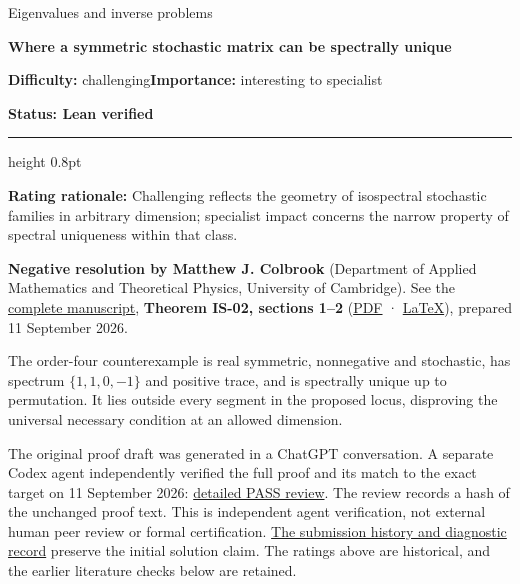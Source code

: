 \documentclass[11pt,a4paper]{article}
\makeatletter
\renewcommand{\subsection}{\Needspace{4\baselineskip}\@startsection{subsection}{2}{0pt}{9pt plus 1pt minus 1pt}{3pt}{\sffamily\bfseries\normalsize\color{ink}}}
\makeatother
\begin{document}
{\sffamily\small\color{muted}Eigenvalues and inverse problems\par}
\vspace{3pt}
{\raggedright{}\sffamily\bfseries\fontsize{21}{24}\selectfont\color{ink}Where
a symmetric stochastic matrix can be spectrally unique\par}
\vspace{7pt}
{\sffamily\small\textbf{Difficulty:} challenging\quad\textbf{Importance:} interesting
to specialist\par}
{\sffamily\small\bfseries\color{accent}Status: Lean verified\par}
\vspace{4pt}
{\color{accent}\hrule height 0.8pt}
\vspace{6pt}
\textbf{Rating rationale:} Challenging reflects the geometry of
isospectral stochastic families in arbitrary dimension; specialist
impact concerns the narrow property of spectral uniqueness within that
class.

\subsection{Resolution --- 2026-09-11}\label{resolution-2026-09-11}

\textbf{Negative resolution by Matthew J. Colbrook} (Department of
Applied Mathematics and Theoretical Physics, University of Cambridge).
See the
\href{https://github.com/ajt60gaibb/OpenProblemsInNLA/blob/main/eigenvalues-and-inverse-problems/IS-02/solution.md}{complete
manuscript}, \textbf{Theorem IS-02, sections 1--2}
(\href{https://github.com/ajt60gaibb/OpenProblemsInNLA/blob/main/eigenvalues-and-inverse-problems/IS-02/solution.pdf}{PDF}
·
\href{https://github.com/ajt60gaibb/OpenProblemsInNLA/blob/main/eigenvalues-and-inverse-problems/IS-02/solution.tex}{LaTeX}),
prepared 11 September 2026.

The order-four counterexample is real symmetric, nonnegative and
stochastic, has spectrum \(\{1,1,0,-1\}\) and positive trace, and is
spectrally unique up to permutation. It lies outside every segment in
the proposed locus, disproving the universal necessary condition at an
allowed dimension.

The original proof draft was generated in a ChatGPT conversation. A
separate Codex agent independently verified the full proof and its match
to the exact target on 11 September 2026:
\href{https://github.com/ajt60gaibb/OpenProblemsInNLA/blob/main/references/colbrook-2026-09-11/verification/reviews/IS-02-review.md}{detailed
PASS review}. The review records a hash of the unchanged proof text.
This is independent agent verification, not external human peer review
or formal certification.
\href{https://github.com/ajt60gaibb/OpenProblemsInNLA/blob/main/references/colbrook-2026-09-11/README.md}{The
submission history and diagnostic record} preserve the initial solution
claim. The ratings above are historical, and the earlier literature
checks below are retained.
\end{document}
